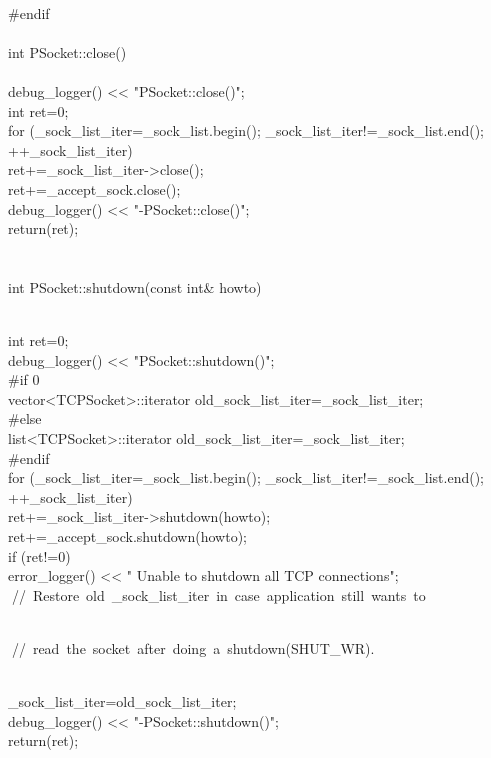 \documentclass{article}
\begin{document}
\\
 #endif
\\
 
\\
 int PSocket::close()
\\
 {
\\
     debug_logger() << "PSocket::close()\n";
\\
         int ret=0;
\\
     for (_sock_list_iter=_sock_list.begin(); _sock_list_iter!=_sock_list.end();
\\
          ++_sock_list_iter)
\\
         ret+=_sock_list_iter->close();
\\
     ret+=_accept_sock.close();
\\
     debug_logger() << "-PSocket::close()\n";    
\\
         return(ret);
\\
 }
\\
 
\\
 int PSocket::shutdown(const int& howto)
\\
 {
\\
     int ret=0;
\\
     debug_logger() << "PSocket::shutdown()\n";
\\
 #if 0
\\
         vector<TCPSocket>::iterator old_sock_list_iter=_sock_list_iter;
\\
 #else
\\
         list<TCPSocket>::iterator old_sock_list_iter=_sock_list_iter;
\\
 #endif
\\
     for (_sock_list_iter=_sock_list.begin(); _sock_list_iter!=_sock_list.end();
\\
          ++_sock_list_iter)
\\
         ret+=_sock_list_iter->shutdown(howto);
\\
     ret+=_accept_sock.shutdown(howto);
\\
     if (ret!=0)
\\
         error_logger() << "    Unable to shutdown all TCP connections\n";
\\
         
\hbox{// Restore old _sock_list_iter in case application still wants to }\strut\\
         
\hbox{// read the socket after doing a shutdown(SHUT_WR).}\strut\\
         _sock_list_iter=old_sock_list_iter;
\\
     debug_logger() << "-PSocket::shutdown()\n";    
\\
     return(ret);
\\
 }
\end{document}

